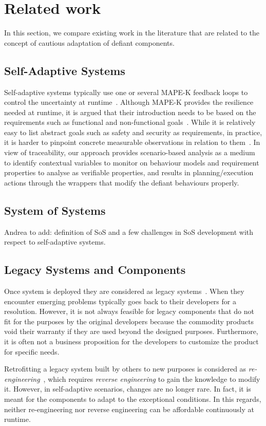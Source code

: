 \section{Related work}
In this section, we compare existing work in the literature that are related to the concept of cautious adaptation of defiant components. 
\subsection{Self-Adaptive Systems}
Self-adaptive systems typically use one or several MAPE-K feedback loops to control the uncertainty at runtime~\cite{SAS}. Although MAPE-K provides the resilience needed at runtime, it is argued that their introduction needs to be based on the requirements such as functional and non-functional goals~\cite{requirements-drivenSAS}. While it is relatively easy to list abstract goals such as safety and security as requirements, in practice, it is harder to pinpoint concrete measurable observations in relation to them~\cite{challengesinSAS}. In view of traceability, our approach provides scenario-based analysis as a medium to identify contextual variables to monitor on behaviour models and requirement properties to analyse as verifiable properties, and results in planning/execution actions through the wrappers that modify the defiant behaviours properly.

\subsection{System of Systems}
Andrea to add: definition of SoS and a few challenges in SoS development with respect to self-adaptive systems.

\subsection{Legacy Systems and Components}
Once system is deployed they are considered as legacy systems~\cite{legacy-systems}. When they encounter emerging problems typically goes back to their developers for a resolution. However, it is not always feasible for legacy components that do not fit for the purposes by the original developers because the commodity products void their warranty if they are used beyond the designed purposes. Furthermore, it is often not a business proposition for the developers to customize the product for specific needs. 

Retrofitting a legacy system built by others to new purposes is considered as {\em re-engineering}~\cite{reengineering}, which requires {\em reverse engineering} to gain the knowledge to modify it. However, in self-adaptive scenarios, changes are no longer rare. In fact, it is meant for the components to adapt to the exceptional conditions. In this regards, neither re-engineering nor reverse engineering can be affordable continuously at runtime.

